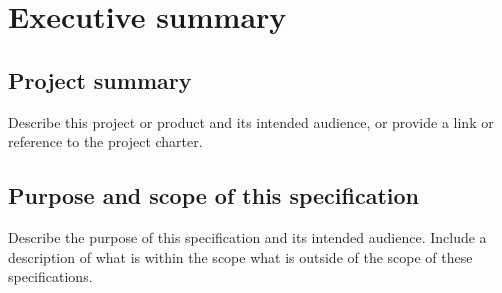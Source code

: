 \section{Executive summary}

\subsection{Project summary}
Describe this project or product and its intended audience, or provide a link or reference to the project charter.
\subsection{Purpose and scope of this specification}
Describe the purpose of this specification and its intended audience.   Include a description of what is within the scope what is outside of the scope of these specifications.